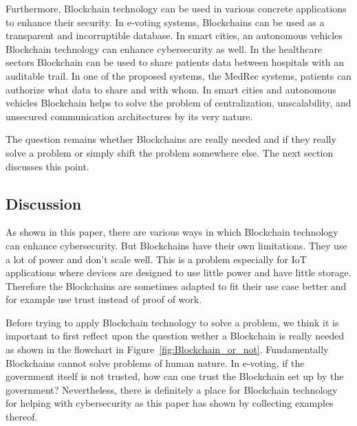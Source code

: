Furthermore, Blockchain technology can be used in various concrete applications to enhance their security.
In e-voting systems, Blockchains can be used as a transparent and incorruptible database.
In smart cities, an autonomous vehicles Blockchain technology can enhance cybersecurity as well.
In the healthcare sectors Blockchain can be used to share patients data between hospitals with an auditable trail. In one of the proposed systems, the MedRec systems, patients can authorize what data to share and with whom.
In smart cities and autonomous vehicles Blockchain helps to solve the problem of centralization, unscalability,
and unsecured communication architectures by its very nature.

The question remains whether Blockchains are really needed and if they really solve a problem or simply shift the problem somewhere else. The next section discusses this point.

\subsection{Discussion}

As shown in this paper, there are various ways in which Blockchain technology can enhance cybersecurity.
But Blockchains have their own limitations. They use a lot of power and don't scale well. This is a problem especially for IoT applications where devices are designed to use little power and have little storage. Therefore the Blockchains are sometimes adapted to fit their use case better and for example use trust instead of proof of work.

Before trying to apply Blockchain technology to solve a problem, we think it is important to first reflect upon the question wether a Blockchain is really needed as shown in the flowchart in Figure~\ref{fig:Blockchain_or_not}.
Fundamentally Blockchains cannot solve problems of human nature. In e-voting, if the government itself is not trusted, how can one trust the Blockchain set up by the government? Nevertheless, there is definitely a place for Blockchain technology for helping with cybersecurity as this paper has shown by collecting examples thereof.








